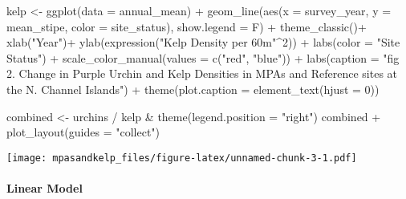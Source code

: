 \documentclass[
]{article}
\newenvironment{Shaded}{\begin{snugshade}}{\end{snugshade}}
\newcommand{\AttributeTok}[1]{\textcolor[rgb]{0.77,0.63,0.00}{#1}}
\newcommand{\DecValTok}[1]{\textcolor[rgb]{0.00,0.00,0.81}{#1}}
\newcommand{\FunctionTok}[1]{\textcolor[rgb]{0.00,0.00,0.00}{#1}}
\newcommand{\NormalTok}[1]{#1}
\newcommand{\OtherTok}[1]{\textcolor[rgb]{0.56,0.35,0.01}{#1}}
\newcommand{\SpecialCharTok}[1]{\textcolor[rgb]{0.00,0.00,0.00}{#1}}
\newcommand{\StringTok}[1]{\textcolor[rgb]{0.31,0.60,0.02}{#1}}
\begin{document}
\begin{Shaded}
\begin{Highlighting}[]
\NormalTok{kelp }\OtherTok{\textless{}{-}} \FunctionTok{ggplot}\NormalTok{(}\AttributeTok{data =}\NormalTok{ annual\_mean) }\SpecialCharTok{+}
  \FunctionTok{geom\_line}\NormalTok{(}\FunctionTok{aes}\NormalTok{(}\AttributeTok{x =}\NormalTok{ survey\_year, }\AttributeTok{y =}\NormalTok{ mean\_stipe, }\AttributeTok{color =}\NormalTok{ site\_status), }\AttributeTok{show.legend =}\NormalTok{ F) }\SpecialCharTok{+}
  \FunctionTok{theme\_classic}\NormalTok{()}\SpecialCharTok{+}
  \FunctionTok{xlab}\NormalTok{(}\StringTok{"Year"}\NormalTok{)}\SpecialCharTok{+}
  \FunctionTok{ylab}\NormalTok{(}\FunctionTok{expression}\NormalTok{(}\StringTok{"Kelp Density per 60m"}\SpecialCharTok{\^{}}\DecValTok{2}\NormalTok{)) }\SpecialCharTok{+}
  \FunctionTok{labs}\NormalTok{(}\AttributeTok{color =} \StringTok{"Site Status"}\NormalTok{)  }\SpecialCharTok{+}
  \FunctionTok{scale\_color\_manual}\NormalTok{(}\AttributeTok{values =} \FunctionTok{c}\NormalTok{(}\StringTok{"red"}\NormalTok{, }\StringTok{"blue"}\NormalTok{)) }\SpecialCharTok{+} 
  \FunctionTok{labs}\NormalTok{(}\AttributeTok{caption =} \StringTok{"fig 2. Change in Purple Urchin and Kelp Densities in MPAs and Reference sites at the N. Channel Islands"}\NormalTok{) }\SpecialCharTok{+}
  \FunctionTok{theme}\NormalTok{(}\AttributeTok{plot.caption =} \FunctionTok{element\_text}\NormalTok{(}\AttributeTok{hjust =} \DecValTok{0}\NormalTok{))}

  


\NormalTok{combined }\OtherTok{\textless{}{-}}\NormalTok{ urchins }\SpecialCharTok{/}\NormalTok{ kelp }\SpecialCharTok{\&} \FunctionTok{theme}\NormalTok{(}\AttributeTok{legend.position =} \StringTok{"right"}\NormalTok{) }
\NormalTok{combined }\SpecialCharTok{+} \FunctionTok{plot\_layout}\NormalTok{(}\AttributeTok{guides =} \StringTok{"collect"}\NormalTok{)}
\end{Highlighting}
\end{Shaded}

\texttt{[image: mpasandkelp\_files/figure-latex/unnamed-chunk-3-1.pdf]}

\hypertarget{linear-model}{%
\paragraph{Linear Model}\label{linear-model}}
\end{document}
